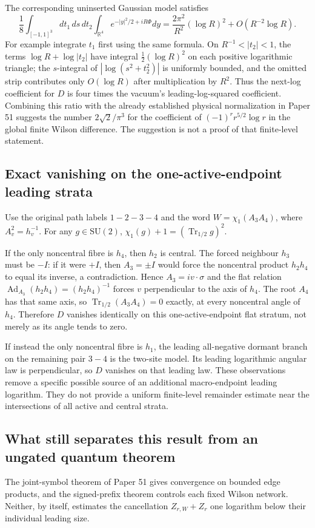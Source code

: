 The corresponding uninserted Gaussian model satisfies
\[
 \frac18\int_{[-1,1]^3}\!dt_1\,ds\,dt_2
   \int_{\mathbb R^4}e^{-|y|^2/2+iR\Phi}dy
       =\frac{2\pi^2}{R^2}(\log R)^2
          +O(R^{-2}\log R).
\]
For example integrate $t_1$ first using the same formula.  On
$R^{-1}<|t_2|<1$, the terms $\log R+\log|t_2|$ have integral
$\tfrac12(\log R)^2$ on each positive logarithmic triangle;
the $s$-integral of $|\log(s^2+t_2^2)|$ is uniformly bounded, and
the omitted strip contributes only $O(\log R)$ after multiplication
by $R^2$.
Thus the next-log coefficient for $D$ is four times the vacuum's
leading-log-squared coefficient.  Combining this ratio with the
already established physical normalization in Paper 51 suggests the
number $2\sqrt2/\pi^3$ for the coefficient of
$(-1)^r r^{5/2}\log r$ in the global finite Wilson difference.
The suggestion is not a proof of that finite-level statement.

\subsection{Exact vanishing on the one-active-endpoint leading strata}
Use the original path labels $1-2-3-4$ and the word
$W=\chi_1(A_3A_4)$, where $A_v^2=h_v^{-1}$.
For any $g\in\mathrm{SU}(2)$,
$\chi_1(g)+1=(\operatorname{Tr}_{1/2}g)^2$.

If the only noncentral fibre is $h_4$, then $h_2$ is central.
The forced neighbour $h_3$ must be $-I$: if it were $+I$, then
$A_3=\pm I$ would force the noncentral product $h_2h_4$ to equal
its inverse, a contradiction.  Hence $A_3=i v\cdot\sigma$ and
the flat relation $\operatorname{Ad}_{A_3}(h_2h_4)=(h_2h_4)^{-1}$
forces $v$ perpendicular to the axis of $h_4$.
The root $A_4$ has that same axis, so
$\operatorname{Tr}_{1/2}(A_3A_4)=0$ exactly, at every noncentral
angle of $h_4$.  Therefore $D$ vanishes identically on this
one-active-endpoint flat stratum, not merely as its angle tends to zero.

If instead the only noncentral fibre is $h_1$, the leading
all-negative dormant branch on the remaining pair $3-4$ is the
two-site model. Its leading logarithmic
angular law is perpendicular, so $D$ vanishes on that leading
law.  These observations remove a specific possible source of an
additional macro-endpoint leading logarithm.  They do not provide
a uniform finite-level remainder estimate near the intersections
of all active and central strata.

\subsection{What still separates this result from an ungated quantum theorem}
The joint-symbol theorem of Paper 51 gives convergence on bounded
edge products, and the signed-prefix theorem controls each fixed
Wilson network.  Neither, by itself, estimates the cancellation
$Z_{r,W}+Z_r$ one logarithm below their individual leading size.

